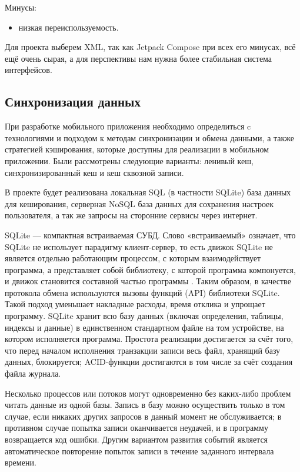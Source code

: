 Минусы:
\begin{itemize}
 \item низкая переиспользуемость.
\end{itemize}

Для проекта выберем XML, так как Jetpack Compose при всех его минусах, всё ещё очень сырая, а для перспективы нам нужна более стабильная система интерфейсов.

\subsection{Синхронизация данных}
При разработке мобильного приложения необходимо определиться c технологиями и подходом к методам синхронизации и обмена данными, а также стратегией кэширования, которые доступны для реализации в мобильном приложении. Были рассмотрены следующие варианты: ленивый кеш, синхронизированный кеш и кеш сквозной записи. 
 
В проекте будет реализована локальная SQL (в частности SQLite) база данных для кеширования, серверная NoSQL база данных для сохранения настроек пользователя, а так же запросы на сторонние сервисы через интернет.

SQLite — компактная встраиваемая СУБД. Слово «встраиваемый» означает, что SQLite не использует парадигму клиент-сервер, то есть движок SQLite не является отдельно работающим процессом, с которым взаимодействует программа, а представляет собой библиотеку, с которой программа компонуется, и движок становится составной частью программы \cite{sqlite1}. Таким образом, в качестве протокола обмена используются вызовы функций (API) библиотеки SQLite. Такой подход уменьшает накладные расходы, время отклика и упрощает программу. SQLite хранит всю базу данных (включая определения, таблицы, индексы и данные) в единственном стандартном файле на том устройстве, на котором исполняется программа. Простота реализации достигается за счёт того, что перед началом исполнения транзакции записи весь файл, хранящий базу данных, блокируется; ACID-функции достигаются в том числе за счёт создания файла журнала.

Несколько процессов или потоков могут одновременно без каких-либо проблем читать данные из одной базы. Запись в базу можно осуществить только в том случае, если никаких других запросов в данный момент не обслуживается; в противном случае попытка записи оканчивается неудачей, и в программу возвращается код ошибки. Другим вариантом развития событий является автоматическое повторение попыток записи в течение заданного интервала времени.

